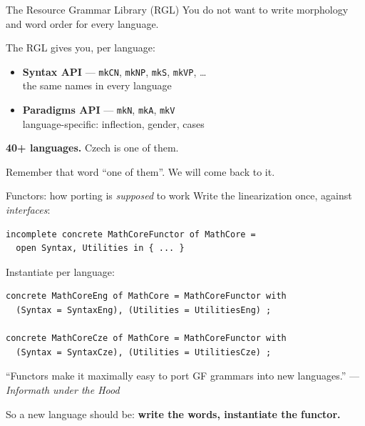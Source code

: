 \documentclass[10pt,aspectratio=169]{beamer}
\begin{document}
\begin{frame}{The Resource Grammar Library (RGL)}
  You do not want to write morphology and word order for every language.

  \vspace{0.5em}
  The RGL gives you, per language:
  \begin{itemize}
    \item \textbf{Syntax API} --- \texttt{mkCN}, \texttt{mkNP}, \texttt{mkS}, \texttt{mkVP}, \dots{}
          \\ \small the same names in every language
    \item \textbf{Paradigms API} --- \texttt{mkN}, \texttt{mkA}, \texttt{mkV}
          \\ \small language-specific: inflection, gender, cases
  \end{itemize}

  \vspace{1em}
  {\large\bf 40+ languages.} \quad Czech is one of them.

  \vspace{0.5em}
  \alert{Remember that word ``one of them''. We will come back to it.}
\end{frame}

\begin{frame}[fragile]{Functors: how porting is \emph{supposed} to work}
  Write the linearization once, against \emph{interfaces}:

\begin{lstlisting}
incomplete concrete MathCoreFunctor of MathCore =
  open Syntax, Utilities in { ... }
\end{lstlisting}

  Instantiate per language:

\begin{lstlisting}
concrete MathCoreEng of MathCore = MathCoreFunctor with
  (Syntax = SyntaxEng), (Utilities = UtilitiesEng) ;

concrete MathCoreCze of MathCore = MathCoreFunctor with
  (Syntax = SyntaxCze), (Utilities = UtilitiesCze) ;
\end{lstlisting}

  \vspace{0.5em}
  ``Functors make it maximally easy to port GF grammars into new languages.''
  \hfill --- \emph{Informath under the Hood}

  \vspace{0.5em}
  So a new language should be: \textbf{write the words, instantiate the functor.}
\end{frame}
\end{document}

